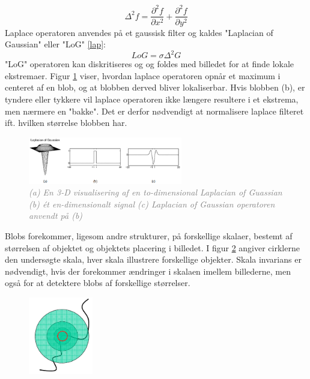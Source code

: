 \begin{equation}
\Delta^2 f = \dfrac{\partial^2 f}{\partial x^2}+\dfrac{\partial^2 f}{\partial y^2}
\end{equation}
 Laplace operatoren anvendes på et gaussisk filter og kaldes "Laplacian of Gaussian" eller "LoG" \eqref{lap}:
\begin{equation}
LoG=\sigma\Delta^2G
\label{lap}
\end{equation}
"LoG" operatoren kan diskritiseres og og foldes med billedet for at finde lokale ekstremaer. Figur \ref{fig:lapgauss} viser, hvordan laplace operatoren opnår et maximum i centeret af en blob, og at blobben derved bliver lokaliserbar. Hvis blobben (b), er tyndere eller tykkere vil laplace operatoren ikke længere resultere i et ekstrema, men nærmere en "bakke". Det er derfor nødvendigt at normalisere laplace filteret ift. hvilken størrelse blobben har.
\begin{figure}[H]
    \centering
    \includegraphics[width=0.60\textwidth]{fig/16.png}
    \vspace{-0.5em}   
    \begin{center}
    \caption{\textcolor{gray}{\footnotesize \textit{
    (a) En 3-D visualisering af en to-dimensional Laplacian of Guassian (b) ét en-dimensionalt signal (c) Laplacian of Gaussian operatoren anvendt på (b)}}}
    \label{fig:lapgauss}
     \end{center}
  \end{figure}
       \vspace{-2.5em}
\noindent
Blobs forekommer, ligesom andre strukturer, på forskellige skalaer, bestemt af størrelsen af objektet og objektets placering i billedet. I figur \ref{fig:scale} angiver cirklerne den undersøgte skala, hver skala illustrere forskellige objekter. Skala invarians er nødvendigt, hvis der forekommer ændringer i skalaen imellem billederne, men også for at detektere blobs af forskellige størrelser.
\begin{figure}[H]
    \centering
    \includegraphics[width=0.25\textwidth]{fig/29.png}
    \vspace{-0.5em}   
    \begin{center}
    \caption{\textcolor{gray}{\footnotesize \textit{
    }}}
    \label{fig:scale}
     \end{center}
  \end{figure}
